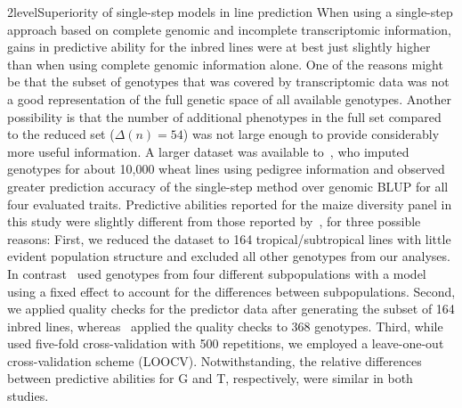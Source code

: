 \documentclass[12pt,titlepage]{article}
\begin{document}
\Genetics2level{Superiority of single-step models in line prediction}
When using a single-step approach based on complete genomic and incomplete
transcriptomic information, gains in predictive ability for the inbred lines
were at best just slightly higher than when using complete genomic information
alone.
One of the reasons might be that the subset of genotypes that was covered by
transcriptomic data was not a good representation of the full genetic space of
all available genotypes.
Another possibility is that the number of additional phenotypes in the full
set compared to the reduced set ($\Delta(n) = 54$) was not large enough to
provide considerably more useful information.
A larger dataset was available to~, who imputed genotypes
for about 10,000 wheat lines using pedigree information and observed greater
prediction accuracy of the single-step method over genomic BLUP for all four
evaluated traits.
Predictive abilities reported for the maize diversity panel in this study were
slightly different from those reported by~, for three
possible reasons:
First, we reduced the dataset to 164 tropical/subtropical lines with little
evident population structure and excluded all other genotypes from our analyses.
In contrast~ used genotypes from four different subpopulations
with a model using a fixed effect to account for the differences between
subpopulations.
Second, we applied quality checks for the predictor data after generating the
subset of 164 inbred lines, whereas~ applied the quality checks to
368 genotypes.
Third, while~ used five-fold cross-validation with 500 repetitions,
we employed a leave-one-out cross-validation scheme (LOOCV).
Notwithstanding, the relative differences between predictive abilities for G 
and T, respectively, were similar in both studies.
\end{document}
